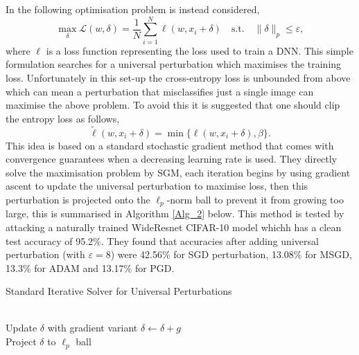 In \cite{shafahi_universal_2018} the following optimisation problem is instead considered, 
$$\max_{\delta} \mathcal{L} (w,\delta) = \frac{1}{N} \sum_{i=1}^N \ell(w,x_i + \delta) \quad \text{s.t.} \quad \| \delta \|_p \leq \varepsilon,$$ 
where $\ell$ is a loss function representing the loss used to train a DNN. This simple formulation searches for a universal perturbation which maximises the training loss. Unfortunately in this set-up the cross-entropy loss is unbounded from above which can mean a perturbation that misclassifies just a single image can maximise the above problem. To avoid this it is suggested that one should clip the entropy loss as follows, 
$$\tilde{\ell}(w,x_i + \delta) = \min \{ \ell(w,x_i+\delta), \beta \}.$$ 
This idea is based on a standard stochastic gradient method that comes with convergence guarantees when a decreasing learning rate is used. They directly solve the maximisation problem by SGM, each iteration begins by using gradient ascent to update the universal perturbation to maximise loss, then this perturbation is projected onto the $\ell_p$-norm ball to prevent it from growing too large, this is summarised in Algorithm \ref{Alg_2} below. This method is tested by attacking a naturally trained WideResnet CIFAR-10 model whichh has a clean test accuracy of 95.2\%. They found that accuracies after adding universal perturbation (with $\varepsilon =8$) were 42.56\% for SGD perturbation, 13.08\% for MSGD, 13.3\% for ADAM and 13.17\% for PGD.
\begin{algorithm}
\caption{Standard Iterative Solver for Universal Perturbations}\label{Alg_2}
\begin{algorithmic}[1]



 \\
\hspace{\algorithmicindent} Update $\delta$ with gradient variant $\delta \gets \delta + g$ \\
\hspace{\algorithmicindent} Project $\delta$ to $\ell_p$ ball


\EndFor
\EndFor
\end{algorithmic}
\end{algorithm}

